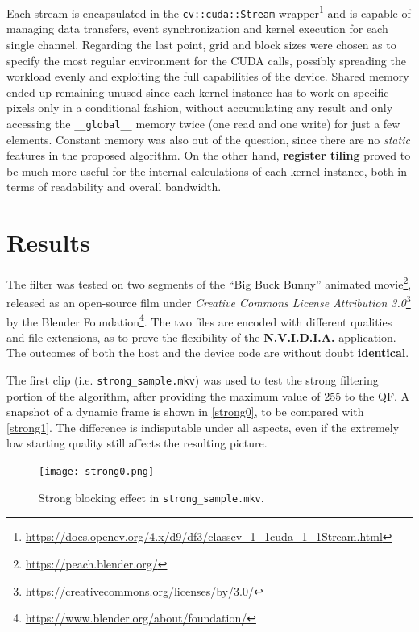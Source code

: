 \documentclass{article}
\begin{document}
Each stream is encapsulated in the \texttt{cv::cuda::Stream} wrapper\footnote{\url{https://docs.opencv.org/4.x/d9/df3/classcv_1_1cuda_1_1Stream.html}} and is capable of managing data transfers, event synchronization and kernel execution for each single channel. Regarding the last point, grid and block sizes were chosen as to specify the most regular environment for the CUDA calls, possibly spreading the workload evenly and exploiting the full capabilities of the device. Shared memory ended up remaining unused since each kernel instance has to work on specific pixels only in a conditional fashion, without accumulating any result and only accessing the \texttt{\_\_global\_\_} memory twice (one read and one write) for just a few elements. Constant memory was also out of the question, since there are no \textit{static} features in the proposed algorithm. On the other hand, \textbf{register tiling} proved to be much more useful for the internal calculations of each kernel instance, both in terms of readability and overall bandwidth.

\section{Results}
The filter was tested on two segments of the ``Big Buck Bunny'' animated movie\footnote{\url{https://peach.blender.org/}}, released as an open-source film under \textit{Creative Commons License Attribution 3.0}\footnote{\url{https://creativecommons.org/licenses/by/3.0/}} by the Blender Foundation\footnote{\url{https://www.blender.org/about/foundation/}}. The two files are encoded with different qualities and file extensions, as to prove the flexibility of the \textsf{\textbf{N.V.I.D.I.A.}} application. The outcomes of both the host and the device code are without doubt \textbf{identical}.

The first clip (i.e. \texttt{strong\_sample.mkv}) was used to test the strong filtering portion of the algorithm, after providing the maximum value of $255$ to the QF. A snapshot of a dynamic frame is shown in \autoref{strong0}, to be compared with \autoref{strong1}. The difference is indisputable under all aspects, even if the extremely low starting quality still affects the resulting picture.

\begin{figure}[!htbp]
  \centering
  \texttt{[image: strong0.png]}
  \caption{Strong blocking effect in \texttt{strong\_sample.mkv}.}
  \label{strong0}
\end{figure}
\end{document}
